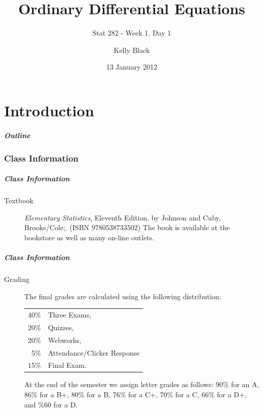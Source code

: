 \part{Introduction}


\title{Ordinary Differential Equations}
\subtitle{Stat 282 - Week 1, Day 1}

\author{Kelly Black}
\date{13 January 2012}

\begin{frame}
  \titlepage
\end{frame}

\begin{frame}
  \frametitle{Outline}
\end{frame}


\section{Class Information}


\begin{frame}
  \frametitle{Class Information}

\begin{description}
\item[Textbook] {\em Elementary Statistics}, Eleventh Edition, by
  Johnson and Cuby, Brooks/Cole;. (ISBN 9780538733502) The book is
  available at the bookstore as well as many on-line outlets.

\end{description}

\end{frame}


\begin{frame}
  \frametitle{Class Information}

\begin{description}
\item[Grading] %
  
  The final grades are calculated using the following distribution:
    \begin{tabular}[t]{rl}
      40\% & Three Exams, \\
      20\% & Quizzes, \\
      20\% & Webworks, \\
      5\%  & Attendance/Clicker Response \\
      15\% & Final Exam.
    \end{tabular}
  
    At the end of the semester we assign letter grades as follows:
    90\% for an A, 86\% for a B+, 80\% for a B, 76\% for a C+, 70\%
    for a C, 66\% for a D+, and \%60 for a D.
\end{description}

\end{frame}



